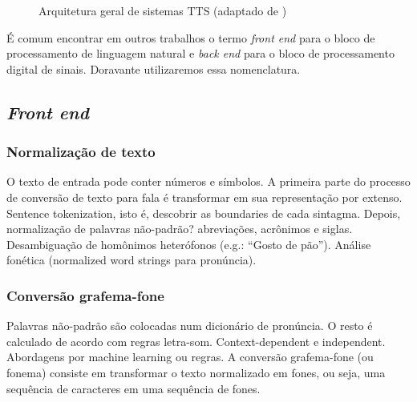 \begin{figure}[!htbp]
\centering
{}
\caption{Arquitetura geral de sistemas TTS (adaptado de )}
\label{fig:tts-arch}
\end{figure}
É comum encontrar em outros trabalhos o termo \emph{front end} para o
bloco de processamento de linguagem natural e \emph{back end} para o bloco de
processamento digital de sinais. Doravante utilizaremos essa nomenclatura.

\subsection{\emph{Front end}}

\subsubsection{Normalização de texto}
O texto de entrada pode conter números e símbolos. A primeira parte do processo de conversão de texto para fala é transformar em sua representação por extenso.
Sentence tokenization, isto é, descobrir as boundaries de cada sintagma. Depois,
normalização de palavras não-padrão? abreviações, acrônimos e siglas.
Desambiguação de homônimos heterófonos (e.g.: ``Gosto de pão''). Análise
fonética (normalized word strings para pronúncia).

\subsubsection{Conversão grafema-fone}
Palavras não-padrão são colocadas num dicionário de pronúncia. O resto é
calculado de acordo com regras letra-som.
Context-dependent e independent. Abordagens por machine learning ou regras.
A conversão grafema-fone (ou fonema) consiste em transformar o texto normalizado
em fones, ou seja, uma sequência de caracteres em uma sequência de fones.

